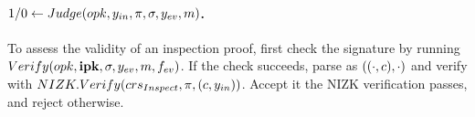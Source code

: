 \paragraph{$1/0 \gets Judge(opk,y_{in},\pi,\sigma,y_{ev},m)$.} %
To assess the validity of an inspection proof, first check the signature
by running $Verify(opk,\mathbf{ipk}, \sigma,y_{ev},m,f_{ev})$. If the check succeeds,
parse \sig as $((\cdot,c),\cdot)$ and verify \NIZKproof with $NIZK.Verify
(crs_{Inspect},\pi,(c,y_{in}))$. Accept it the NIZK verification
passes, and reject otherwise.

%

